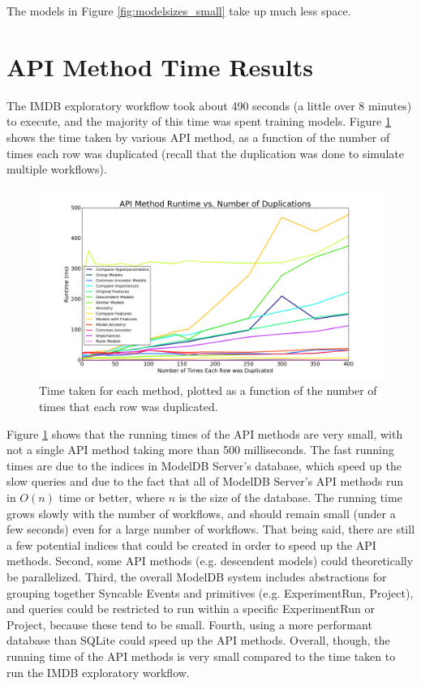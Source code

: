 The models in Figure \ref{fig:modelsizes_small} take up much less space.

\section{API Method Time Results}
The IMDB exploratory workflow took about 490 seconds (a little over 8 minutes)
to execute, and the majority of this time was spent training models. Figure \ref{fig:methodtimes}
shows the time taken by various API method, as a function of the number of times each row
was duplicated (recall that the duplication was done to simulate multiple workflows).

\begin{figure}
  \centering
  \includegraphics[width=6.0in]{methodtimes}
  \caption{
    Time taken for each method, plotted as a function of the number of times that
    each row was duplicated.
  }
  \label{fig:methodtimes}
\end{figure}

Figure \ref{fig:methodtimes} shows that the running times of the API methods are
very small, with not a single API method taking more than 500 milliseconds. The fast running
times are due to the indices in ModelDB Server's database, which speed up the slow queries
and due to the fact that all of ModelDB Server's API methods run in $O(n)$ time or better, where
$n$ is the size of the database. The running time grows slowly with the number of workflows, and
should remain small (under a few seconds) even for a large number of workflows. That being said, there are still
a few potential indices that could be created in order to speed up the API methods. Second, some API
methods (e.g. descendent models) could theoretically be parallelized. Third, the overall ModelDB system includes
abstractions for grouping together Syncable Events and primitives (e.g. ExperimentRun, Project), and queries could be
restricted to run within a specific ExperimentRun or Project, because these tend to be small. Fourth,
using a more performant database than SQLite could speed up the API methods. Overall, though, the running
time of the API methods is very small compared to the time taken to run the IMDB exploratory workflow.

